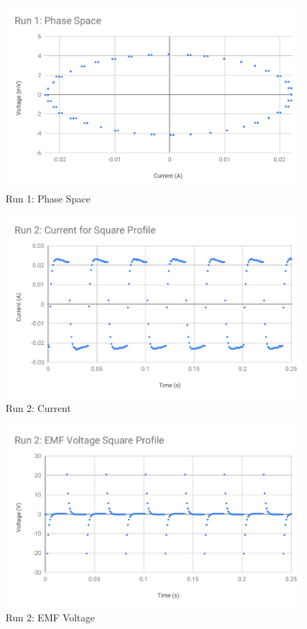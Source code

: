 %
\begin{figure}[ht]
	\centering
	\includegraphics[scale=0.74]{image/04-faraday/run-1-phase-space.pdf}
	\caption{Run 1: Phase Space}
	\label{figure.04.run.1.phase.space}
\end{figure}
%
\begin{figure}[ht]
	\centering
	\includegraphics[scale=0.74]{image/04-faraday/run-2-I.pdf}
	\caption{Run 2: Current}
	\label{figure.04.run.2.I}
\end{figure}
%
\begin{figure}[ht]
	\centering
	\includegraphics[scale=0.74]{image/04-faraday/run-2-V.pdf}
	\caption{Run 2: EMF Voltage}
	\label{figure.04.run.2.V}
\end{figure}
